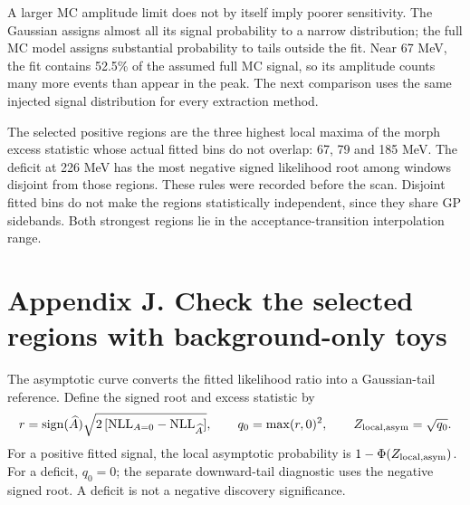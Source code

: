 \documentclass[11pt]{article}
\begin{document}
A larger MC amplitude limit does not by itself imply poorer sensitivity. The Gaussian assigns almost all its signal probability to a narrow distribution; the full MC model assigns substantial probability to tails outside the fit. Near 67 MeV, the fit contains 52.5\% of the assumed full MC signal, so its amplitude counts many more events than appear in the peak. The next comparison uses the same injected signal distribution for every extraction method.

The selected positive regions are the three highest local maxima of the morph excess statistic whose actual fitted bins do not overlap: 67, 79 and 185 MeV. The deficit at 226 MeV has the most negative signed likelihood root among windows disjoint from those regions. These rules were recorded before the scan. Disjoint fitted bins do not make the regions statistically independent, since they share GP sidebands. Both strongest regions lie in the acceptance-transition interpolation range.
\clearpage\section*{Appendix J. Check the selected regions with background-only toys}

The asymptotic curve converts the fitted likelihood ratio into a Gaussian-tail reference. Define the signed root and excess statistic by
\[
 r=\operatorname{sign}(\widehat A)\sqrt{2\,[\mathrm{NLL}_{A=0}-\mathrm{NLL}_{\widehat A}]},
 \qquad q_0=\max(r,0)^2,\qquad Z_{\rm local,asym}=\sqrt{q_0}.
\]
For a positive fitted signal, the local asymptotic probability is $1-\Phi(Z_{\rm local,asym})$. For a deficit, $q_0=0$; the separate downward-tail diagnostic uses the negative signed root. A deficit is not a negative discovery significance.
\end{document}
